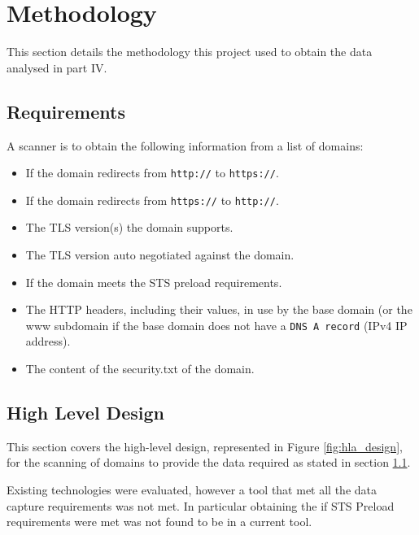 \documentclass{mscreport}
\begin{document}
\section{Methodology}
\label{section:methodology}

This section details the methodology this project used to obtain the data analysed in part IV.

\subsection{Requirements}
\label{subsection:requirements}

A scanner is to obtain the following information from a list of domains:

\begin{itemize}
	\setlength\itemsep{0.1em}
    \item If the domain redirects from \texttt{http://} to \texttt{https://}.
    \item If the domain redirects from \texttt{https://} to \texttt{http://}.
    \item The TLS version(s) the domain supports.
    \item The TLS version auto negotiated against the domain.
    \item If the domain meets the STS preload requirements.
    \item The HTTP headers, including their values, in use by the base domain (or the www subdomain if the base domain does not have a \texttt{DNS A record} (IPv4 IP address).
    \item The content of the security.txt of the domain.
\end{itemize}

\subsection{High Level Design}
\label{subsection:hld}

This section covers the high-level design, represented in Figure \ref{fig:hla_design}, for the scanning of domains to provide the data required as stated in section
\ref{subsection:requirements}.

\vspace{0.3cm} \noindent
Existing technologies were evaluated, however a tool that met all the data capture requirements was not met. In particular obtaining the if STS Preload requirements were met was not found to be in a current tool.

\end{document}
